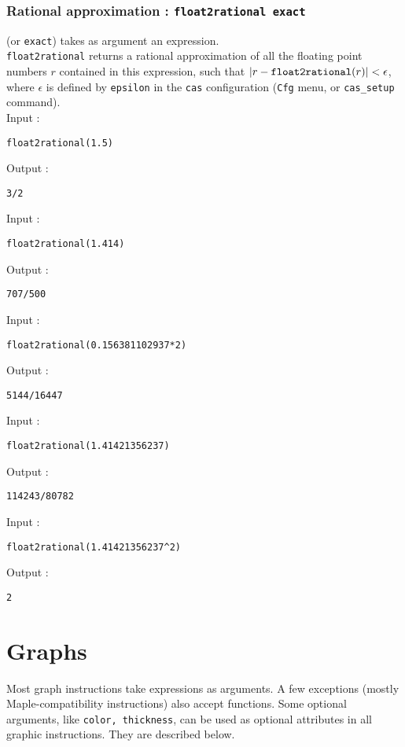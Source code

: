 \documentclass[a4paper,11pt]{book}
\begin{document}
\subsection{Rational approximation : {\tt float2rational exact}}
 (or {\tt exact}) 
takes as argument an expression.\\
{\tt float2rational} returns a rational approximation of 
all the floating point numbers $r$ contained in this expression, such
that $|r-\mbox{\tt float2rational}(r)|<\epsilon$, where
$\epsilon$  is defined by {\tt epsilon} in the {\tt cas} configuration 
({\tt Cfg} menu, or {\tt cas\_setup} command).\\
Input :
\begin{center}{\tt float2rational(1.5)}\end{center}
Output :
\begin{center}{\tt 3/2}\end{center}
Input :
\begin{center}{\tt float2rational(1.414)}\end{center}
Output :
\begin{center}{\tt 707/500}\end{center}
Input :
\begin{center}{\tt float2rational(0.156381102937*2)}\end{center}
Output :
\begin{center}{\tt 5144/16447}\end{center}
Input :
\begin{center}{\tt float2rational(1.41421356237)}\end{center}
Output :
\begin{center}{\tt 114243/80782}\end{center}
Input :
\begin{center}{\tt float2rational(1.41421356237\verb|^|2)}\end{center}
Output :
\begin{center}{\tt 2}\end{center}

\chapter{Graphs}\label{sec:plot}
Most graph instructions take expressions as arguments. A few
exceptions (mostly Maple-compatibility instructions) also accept
functions. 
Some optional arguments, like {\tt color, thickness}, can  be used as optional
attributes in all graphic instructions. They are described below.
\end{document}
